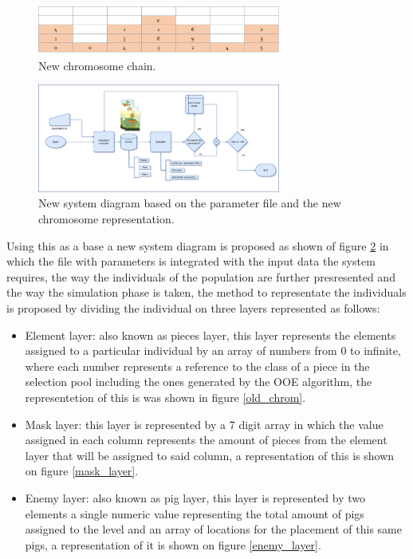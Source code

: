\documentclass[conference]{IEEEtran}
\begin{document}
    \begin{figure}[htbp]
    \centerline{\includegraphics[width=80mm]{Images/chromosome_chain_new_model.png}}
    \caption{New chromosome chain.}
    \label{new_chrom}
    \end{figure}
    
    \begin{figure}[htbp]
    \centerline{\includegraphics[width=80mm]{Images/new_model_v2.png}}
    \caption{New system diagram based on the parameter file and the new chromosome representation.}
    \label{new_model}
    \end{figure}
    
    Using this as a base a new system diagram is proposed as shown of figure
    \ref{new_model} in which the file with parameters is integrated with the input
    data  the system requires, the way the individuals of the population are further
    presresented and the way the simulation phase is taken, the method to
    representate the individuals is proposed by dividing the individual on three
    layers represented as follows:
    
    \begin{itemize}
        \item Element layer: also known as pieces layer, this layer represents the
        elements assigned to a particular individual by an array of numbers from 0
        to infinite, where each number represents a reference to the class of a piece
        in the selection pool including the ones generated by the OOE algorithm, the
        representetion of this is was shown in figure \ref{old_chrom}.
        \item  Mask layer: this layer is represented by a 7 digit array in which the
        value assigned in each column represents the amount of pieces from the
        element layer that will be assigned to said column, a representation of this
        is shown on figure \ref{mask_layer}.
        \item Enemy layer: also known as pig layer, this layer is represented by two
        elements a single numeric value representing the total amount of pigs
        assigned to the level and an array of locations for the placement of this
        same pigs, a representation of it is shown on figure \ref{enemy_layer}. 
    \end{itemize}
    
\end{document}
